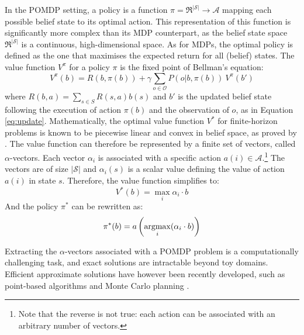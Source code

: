 In the POMDP setting, a policy is a function $\pi = \Re^{|\mathcal{S}|} \rightarrow \mathcal{A}$ mapping each possible belief state to its optimal action.  This representation of this function is significantly more complex than its MDP counterpart, as the belief state space $\Re^{|\mathcal{S}|}$ is a continuous, high-dimensional space.  As for MDPs, the optimal policy is defined as the one that maximises the expected return for all (belief) states. The value function $V^{\pi}$ for a policy $\pi$ is the fixed point of Bellman's equation: 
\begin{equation}
V^{\pi}(b) = R(b,\pi(b)) + \gamma \sum_{o \in \mathcal{O}} P(o|b,\pi(b)) \ V^{\pi}(b')
\end{equation}
where $R(b,a) = \sum_{s \in S} R(s,a) b(s)$ and $b'$ is the updated belief state following the execution of action $\pi(b)$ and the observation of $o$, as in Equation \ref{eq:update}.  Mathematically, the optimal value function $V^*$ for finite-horizon problems is known to be piecewise linear and convex in belief space, as proved by \cite{Sondik1971}. The value function can therefore be represented by a finite set of vectors, called $\alpha$-vectors. Each vector $\alpha_i$ is associated with a specific action $a(i) \in \mathcal{A}$.\footnote{Note that the reverse is not true: each action can be associated with an arbitrary number of vectors.}  The vectors are of size $|\mathcal{S}|$ and $\alpha_i(s)$ is a scalar value defining the value of action $a(i)$ in state $s$.  Therefore, the value function simplifies to:
\begin{equation}
V^*(b) = \max_{i} \alpha_i \cdot b
\end{equation}
And the policy $\pi^*$ can be rewritten as:
\begin{equation}
\pi^*(b) = a\left(\argmax_i(\alpha_i \cdot b)\right)
\end{equation}

Extracting the $\alpha$-vectors associated with a POMDP problem is a computationally challenging task, and exact solutions are intractable beyond toy domains.  Efficient approximate solutions have however been recently developed, such as point-based algorithms \citep{Pineau_2003,KurHsu08} and Monte Carlo planning \citep{NIPS2010_0740}.  

